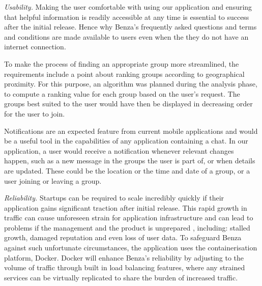 \documentclass{article}
\begin{document}
    
    \emph{Usability.} Making the user comfortable with using our application and ensuring that helpful information is readily accessible at any time is essential to success after the initial release. Hence why Benza's frequently asked questions and terms and conditions are made available to users even when the they do not have an internet connection. \par
    
    To make the process of finding an appropriate group more streamlined, the requirements include a point about ranking groups according to geographical proximity. For this purpose, an algorithm was planned during the analysis phase, to compute a ranking value for each group based on the user's request. The groups best suited to the user would have then be displayed in decreasing order for the user to join.%
    \par

    Notifications are an expected feature from current mobile applications and would be a useful tool in the capabilities of any application containing a chat. In our application, a user would receive a notification whenever relevant changes happen, such as a new message in the groups the user is part of, or when details are updated. These could be the location or the time and date of a group, or a user joining or leaving a group. %
    \par
    
    \emph{Reliability.} Startups can be required to scale incredibly quickly if their application gains significant traction after initial release. This rapid growth in traffic can cause unforeseen strain for application infrastructure and can lead to problems if the management and the product is unprepared \cite{scalingupstanfordpresentation}, including: stalled growth, damaged reputation and even loss of user data. To safeguard Benza against such unfortunate circumstances, the application uses the containerisation platform, Docker. Docker will enhance Benza's reliability by adjusting to the volume of traffic through built in load balancing features, where any strained services can be virtually replicated to share the burden of increased traffic. \par 
    
\end{document}
